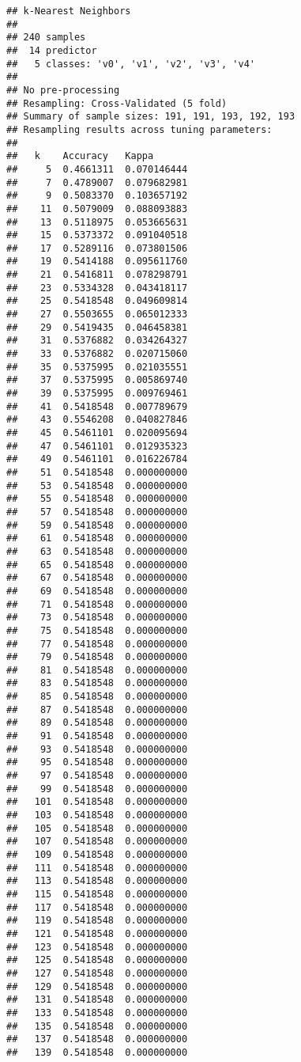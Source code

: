 \documentclass[
]{article}
\begin{document}
\begin{verbatim}
## k-Nearest Neighbors 
## 
## 240 samples
##  14 predictor
##   5 classes: 'v0', 'v1', 'v2', 'v3', 'v4' 
## 
## No pre-processing
## Resampling: Cross-Validated (5 fold) 
## Summary of sample sizes: 191, 191, 193, 192, 193 
## Resampling results across tuning parameters:
## 
##   k    Accuracy   Kappa      
##     5  0.4661311  0.070146444
##     7  0.4789007  0.079682981
##     9  0.5083370  0.103657192
##    11  0.5079009  0.088093883
##    13  0.5118975  0.053665631
##    15  0.5373372  0.091040518
##    17  0.5289116  0.073801506
##    19  0.5414188  0.095611760
##    21  0.5416811  0.078298791
##    23  0.5334328  0.043418117
##    25  0.5418548  0.049609814
##    27  0.5503655  0.065012333
##    29  0.5419435  0.046458381
##    31  0.5376882  0.034264327
##    33  0.5376882  0.020715060
##    35  0.5375995  0.021035551
##    37  0.5375995  0.005869740
##    39  0.5375995  0.009769461
##    41  0.5418548  0.007789679
##    43  0.5546208  0.040827846
##    45  0.5461101  0.020095694
##    47  0.5461101  0.012935323
##    49  0.5461101  0.016226784
##    51  0.5418548  0.000000000
##    53  0.5418548  0.000000000
##    55  0.5418548  0.000000000
##    57  0.5418548  0.000000000
##    59  0.5418548  0.000000000
##    61  0.5418548  0.000000000
##    63  0.5418548  0.000000000
##    65  0.5418548  0.000000000
##    67  0.5418548  0.000000000
##    69  0.5418548  0.000000000
##    71  0.5418548  0.000000000
##    73  0.5418548  0.000000000
##    75  0.5418548  0.000000000
##    77  0.5418548  0.000000000
##    79  0.5418548  0.000000000
##    81  0.5418548  0.000000000
##    83  0.5418548  0.000000000
##    85  0.5418548  0.000000000
##    87  0.5418548  0.000000000
##    89  0.5418548  0.000000000
##    91  0.5418548  0.000000000
##    93  0.5418548  0.000000000
##    95  0.5418548  0.000000000
##    97  0.5418548  0.000000000
##    99  0.5418548  0.000000000
##   101  0.5418548  0.000000000
##   103  0.5418548  0.000000000
##   105  0.5418548  0.000000000
##   107  0.5418548  0.000000000
##   109  0.5418548  0.000000000
##   111  0.5418548  0.000000000
##   113  0.5418548  0.000000000
##   115  0.5418548  0.000000000
##   117  0.5418548  0.000000000
##   119  0.5418548  0.000000000
##   121  0.5418548  0.000000000
##   123  0.5418548  0.000000000
##   125  0.5418548  0.000000000
##   127  0.5418548  0.000000000
##   129  0.5418548  0.000000000
##   131  0.5418548  0.000000000
##   133  0.5418548  0.000000000
##   135  0.5418548  0.000000000
##   137  0.5418548  0.000000000
##   139  0.5418548  0.000000000

\end{verbatim}
\end{document}
